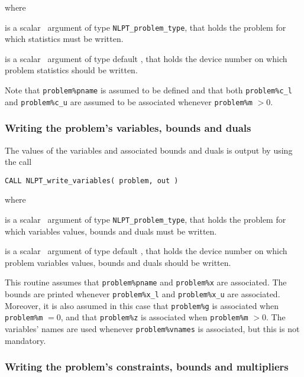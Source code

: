 \documentclass{galahad}
\newcommand{\packagename}{NLPT}
\begin{document}
\noindent where
\begin{description}
 is a scalar \intentin\ argument of type {\tt NLPT\_problem\_type},
that holds the problem for which statistics must be written.

 is a scalar \intentin\ argument of type default \integer, that
holds the device number on which problem statistics should be written.
\end{description}

\noindent
Note that {\tt problem\%pname} is assumed to be defined and that both
{\tt problem\%c\_l} and {\tt problem\%c\_u} are assumed to be associated
whenever {\tt problem\%m} $> 0$.

\subsubsection{Writing the problem's variables, bounds and duals}
\label{w_vars}


The values of the variables and associated bounds and duals is output
by using the call
\vspace*{1mm}

\hspace{8mm}
{\tt CALL \packagename\_write\_variables( problem, out )}

\noindent where
\begin{description}
 is a scalar \intentin\ argument of type {\tt NLPT\_problem\_type},
that holds the problem for which variables values, bounds and duals must be
written.

 is a scalar \intentin\ argument of type default \integer, that
holds the device number on which problem variables values, bounds and duals
should be written.
\end{description}

\noindent
This routine assumes that {\tt problem\%pname} and {\tt problem\%x} are
associated. The bounds are printed whenever {\tt problem\%x\_l} and
{\tt problem\%x\_u} are associated. Moreover, it is also
assumed in this case that {\tt problem\%g} is associated when {\tt problem\%m}
$= 0$, and that {\tt problem\%z}  is associated when {\tt problem\%m} $> 0$.
The variables' names are used whenever {\tt problem\%vnames} is associated, but
this is not mandatory.

\subsubsection{Writing the problem's constraints, bounds and multipliers}
\label{w_cons}
\end{document}
